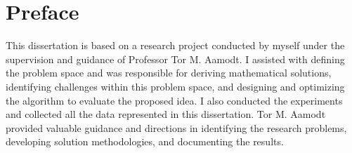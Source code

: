 
\chapter{Preface}
This  dissertation  is  based  on  a  research  project  conducted  by  myself  under  the supervision and guidance of Professor Tor M. Aamodt.  I assisted with defining the problem space and was responsible for deriving mathematical solutions, identifying  challenges  within  this  problem  space,  and  designing  and  optimizing  the algorithm to evaluate the proposed idea. I also conducted the experiments and collected all the data represented in this dissertation. Tor  M.  Aamodt  provided  valuable  guidance  and  directions  in  identifying the research problems, developing solution methodologies, and documenting the results.